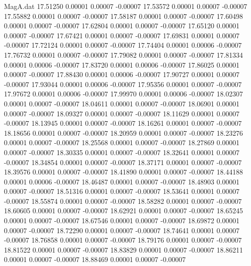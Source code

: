 \begin{filecontents}{MagA.dat}
  17.51250    0.00001    0.00007   -0.00007
  17.53572    0.00001    0.00007   -0.00007
  17.55882    0.00001    0.00007   -0.00007
  17.58187    0.00001    0.00007   -0.00007
  17.60498    0.00001    0.00007   -0.00007
  17.62804    0.00001    0.00007   -0.00007
  17.65120    0.00001    0.00007   -0.00007
  17.67421    0.00001    0.00007   -0.00007
  17.69831    0.00001    0.00007   -0.00007
  17.72124    0.00001    0.00007   -0.00007
  17.74404    0.00001    0.00006   -0.00007
  17.76732    0.00001    0.00007   -0.00007
  17.79082    0.00001    0.00007   -0.00007
  17.81334    0.00001    0.00006   -0.00007
  17.83720    0.00001    0.00006   -0.00007
  17.86025    0.00001    0.00007   -0.00007
  17.88430    0.00001    0.00006   -0.00007
  17.90727    0.00001    0.00007   -0.00007
  17.93044    0.00001    0.00006   -0.00007
  17.95356    0.00001    0.00007   -0.00007
  17.97672    0.00001    0.00006   -0.00007
  17.99970    0.00001    0.00006   -0.00007
  18.02307    0.00001    0.00007   -0.00007
  18.04611    0.00001    0.00007   -0.00007
  18.06901    0.00001    0.00007   -0.00007
  18.09327    0.00001    0.00007   -0.00007
  18.11629    0.00001    0.00007   -0.00007
  18.13945    0.00001    0.00007   -0.00007
  18.16261    0.00001    0.00007   -0.00007
  18.18656    0.00001    0.00007   -0.00007
  18.20959    0.00001    0.00007   -0.00007
  18.23276    0.00001    0.00007   -0.00007
  18.25568    0.00001    0.00007   -0.00007
  18.27869    0.00001    0.00007   -0.00007
  18.30335    0.00001    0.00007   -0.00007
  18.32641    0.00001    0.00007   -0.00007
  18.34854    0.00001    0.00007   -0.00007
  18.37171    0.00001    0.00007   -0.00007
  18.39576    0.00001    0.00007   -0.00007
  18.41890    0.00001    0.00007   -0.00007
  18.44188    0.00001    0.00006   -0.00007
  18.46487    0.00001    0.00007   -0.00007
  18.48903    0.00001    0.00007   -0.00007
  18.51316    0.00001    0.00007   -0.00007
  18.53641    0.00001    0.00007   -0.00007
  18.55874    0.00001    0.00007   -0.00007
  18.58282    0.00001    0.00007   -0.00007
  18.60605    0.00001    0.00007   -0.00007
  18.62921    0.00001    0.00007   -0.00007
  18.65245    0.00001    0.00007   -0.00007
  18.67546    0.00001    0.00007   -0.00007
  18.69872    0.00001    0.00007   -0.00007
  18.72290    0.00001    0.00007   -0.00007
  18.74641    0.00001    0.00007   -0.00007
  18.76858    0.00001    0.00007   -0.00007
  18.79176    0.00001    0.00007   -0.00007
  18.81522    0.00001    0.00007   -0.00007
  18.83829    0.00001    0.00007   -0.00007
  18.86211    0.00001    0.00007   -0.00007
  18.88469    0.00001    0.00007   -0.00007

\end{filecontents}
